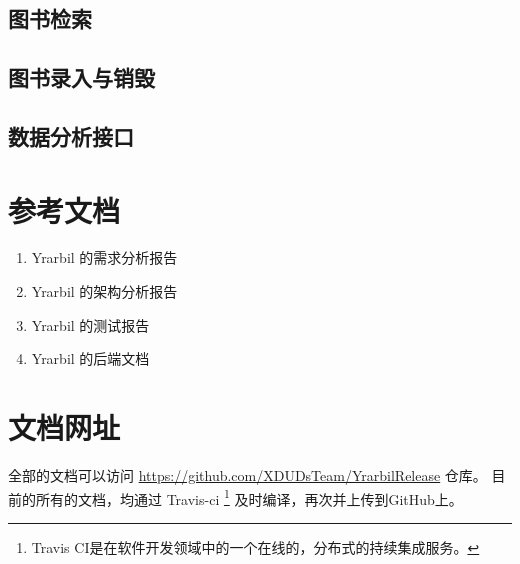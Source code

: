 \documentclass[UTF8]{article}
\begin{document}
        \subsection{图书检索}
        \subsection{图书录入与销毁}

        \subsection{数据分析接口}








    \newpage
    \begin{appendices}
    \section{参考文档}
    \begin{enumerate}
        \item Yrarbil 的需求分析报告
        \item Yrarbil 的架构分析报告
        \item Yrarbil 的测试报告
        \item Yrarbil 的后端文档
    \end{enumerate}
    \section{文档网址}
         全部的文档可以访问 \url{https://github.com/XDUDsTeam/YrarbilRelease} 仓库。
      目前的所有的文档，均通过 Travis-ci
      \footnote{Travis CI是在软件开发领域中的一个在线的，分布式的持续集成服务。}
      及时编译，再次并上传到GitHub上。 
      
    \end{appendices}
\end{document}
